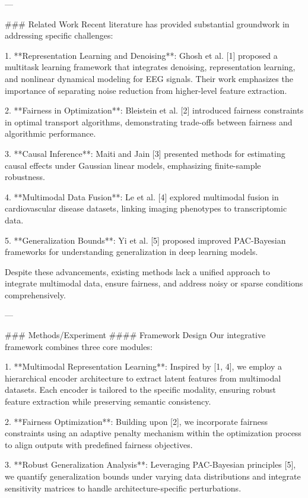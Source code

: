 ---

### Related Work  
Recent literature has provided substantial groundwork in addressing specific challenges:  

1. **Representation Learning and Denoising**: Ghosh et al. [1] proposed a multitask learning framework that integrates denoising, representation learning, and nonlinear dynamical modeling for EEG signals. Their work emphasizes the importance of separating noise reduction from higher-level feature extraction.  

2. **Fairness in Optimization**: Bleistein et al. [2] introduced fairness constraints in optimal transport algorithms, demonstrating trade-offs between fairness and algorithmic performance.  

3. **Causal Inference**: Maiti and Jain [3] presented methods for estimating causal effects under Gaussian linear models, emphasizing finite-sample robustness.  

4. **Multimodal Data Fusion**: Le et al. [4] explored multimodal fusion in cardiovascular disease datasets, linking imaging phenotypes to transcriptomic data.  

5. **Generalization Bounds**: Yi et al. [5] proposed improved PAC-Bayesian frameworks for understanding generalization in deep learning models.  

Despite these advancements, existing methods lack a unified approach to integrate multimodal data, ensure fairness, and address noisy or sparse conditions comprehensively.  

---

### Methods/Experiment  
#### Framework Design  
Our integrative framework combines three core modules:  

1. **Multimodal Representation Learning**: Inspired by [1, 4], we employ a hierarchical encoder architecture to extract latent features from multimodal datasets. Each encoder is tailored to the specific modality, ensuring robust feature extraction while preserving semantic consistency.  

2. **Fairness Optimization**: Building upon [2], we incorporate fairness constraints using an adaptive penalty mechanism within the optimization process to align outputs with predefined fairness objectives.  

3. **Robust Generalization Analysis**: Leveraging PAC-Bayesian principles [5], we quantify generalization bounds under varying data distributions and integrate sensitivity matrices to handle architecture-specific perturbations.  

